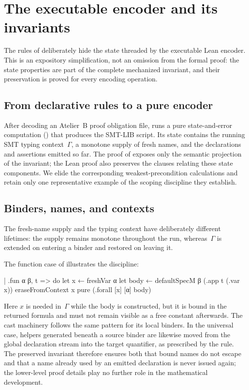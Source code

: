 \section{The executable encoder and its invariants}
\label{sec:beer-implementation}

The rules of  deliberately hide the state threaded by the executable Lean encoder.
This is an expository simplification, not an omission from the formal proof: the state properties are part of the complete mechanized invariant, and their preservation is proved for every encoding operation.

\subsection{From declarative rules to a pure encoder}
\label{sec:lean-implementation-architecture}

After decoding an Atelier~B proof obligation file, \beer{} runs a pure state-and-error computation ({\small{}}) that produces the SMT-LIB script.
Its state contains the running SMT typing context~$\Gamma$, a monotone supply of fresh names, and the declarations and assertions emitted so far.
The proof of  exposes only the semantic projection of the invariant; the Lean proof also preserves the clauses relating these state components.
We elide the corresponding weakest-precondition calculations and retain only one representative example of the scoping discipline they establish.

\subsection{Binders, names, and contexts}
\label{sec:binders-names-contexts}

The fresh-name supply and the typing context have deliberately different lifetimes: the supply remains monotone throughout the run, whereas~$\Gamma$ is extended on entering a binder and restored on leaving it.

The function case of {\small{}} illustrates the discipline:
\begin{leanlisting}
| .fun α β, t => do
    let x    ← freshVar α
    let body ← defaultSpecM β (.app t (.var x))
    eraseFromContext x
    pure (.forall [x] [α] body)
\end{leanlisting}
Here $x$ is needed in~$\Gamma$ while the body is constructed, but it is bound in the returned formula and must not remain visible as a free constant afterwards.
The cast machinery follows the same pattern for its local binders.
In the universal case, helpers generated beneath a source binder are likewise moved from the global declaration stream into the target quantifier, as prescribed by the  rule.
The preserved invariant therefore ensures both that bound names do not escape and that a name already used by an emitted declaration is never issued again; the lower-level proof details play no further role in the mathematical development.
